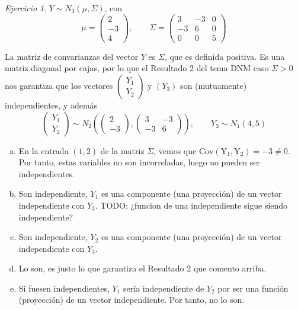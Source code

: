 \documentclass[12pt,spanish]{article}
\theoremstyle{definition}
\theoremstyle{remark}
\newtheorem{exercise}{Ejercicio}
\begin{document}
\newpage

\begin{exercise}
  $Y\sim N_3(\mu,\Sigma)$, con
  \[\mu=
    \begin{pmatrix}
      2 \\
      -3 \\
      4
    \end{pmatrix},\qquad \Sigma=
    \begin{pmatrix}
      3 & -3 & 0 \\
      -3 & 6 & 0 \\
      0 & 0 & 5
    \end{pmatrix}
  \]

  La matriz de convarianzas del vector $Y$ es $\Sigma$, que es
  definida positiva. Es una matriz diagonal por cajas, por lo que el
  Resultado 2 del tema DNM caso $\Sigma>0$ nos garantiza que los
  vectores $
  \begin{pmatrix}
    Y_1 \\
    Y_2
  \end{pmatrix}$ y $(Y_3)$ son (mutuamente) independientes, y además
  \[\begin{pmatrix}
    Y_1 \\
    Y_2
  \end{pmatrix}\sim N_2\left(\begin{pmatrix}
      2 \\
      -3
    \end{pmatrix},\begin{pmatrix}
      3 & -3 \\
      -3 & 6
    \end{pmatrix}\right),\qquad Y_3\sim N_1(4,5)\]
  
  \begin{enumerate}[a)]
  \item En la entrada $(1,2)$ de la matriz $\Sigma$, vemos que
    $\operatorname{Cov(Y_1,Y_2)}=-3\neq 0$. Por tanto, estas variables
    no son incorreladas, luego no pueden ser independientes.
  \item Son independiente, $Y_1$ es una componente (una proyección) de
    un vector independiente con $Y_3$. TODO: ¿funcion de una
    independiente sigue siendo independiente?
  \item Son independiente, $Y_2$ es una componente (una proyección) de
    un vector independiente con $Y_3$.
  \item Lo son, es justo lo que garantiza el Resultado 2 que comento
    arriba.
  \item Si fuesen independientes, $Y_1$ sería independiente de $Y_2$
    por ser una función (proyección) de un vector independiente. Por
    tanto, no lo son.
  \end{enumerate}
\end{exercise}
\end{document}
